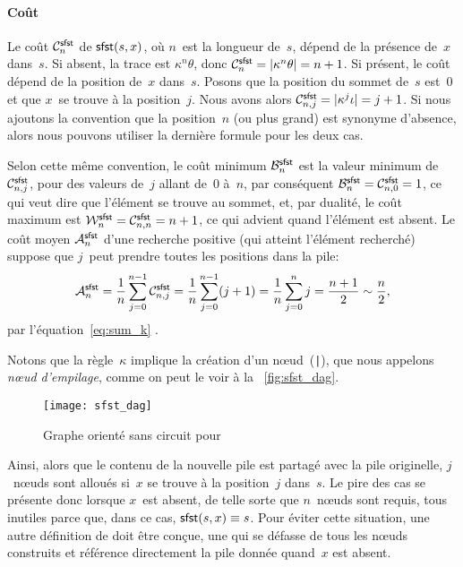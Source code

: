 \paragraph{Coût}

Le coût \(\C{\fun{sfst}}{n}\) de
\(\fun{sfst}(s,x)\), où \(n\)~est la longueur de~\(s\), dépend de la
présence de~\(x\) dans~\(s\). Si absent, la trace est
\(\kappa^n\theta\), donc \(\C{\fun{sfst}}{n} = \len{\kappa^n\theta} =
n + 1\). Si présent, le coût dépend de la position de~\(x\)
dans~\(s\). Posons que la position du sommet de~\(s\) est~\(0\) et que
\(x\)~se trouve à la position~\(j\). Nous avons alors
\(\C{\fun{sfst}}{n,j} = \len{\kappa^j\iota} = j +
1\). Si nous ajoutons la convention
que la position~\(n\) (ou plus grand) est synonyme d'absence, alors
nous pouvons utiliser la dernière formule pour les deux cas.

Selon cette même convention, le coût minimum
\(\B{\fun{sfst}}{n}\) est la valeur
minimum de \(\C{\fun{sfst}}{n,j}\),
pour des valeurs de~\(j\) allant de~\(0\) à~\(n\), par conséquent
\(\B{\fun{sfst}}{n} = \C{\fun{sfst}}{n,0} = 1\), ce qui veut dire que
l'élément se trouve au sommet, et, par dualité, le coût
maximum
est \(\W{\fun{sfst}}{n} =
\C{\fun{sfst}}{n,n} = n + 1\), ce qui advient quand l'élément est
absent. Le coût moyen
\(\M{\fun{sfst}}{n}\) d'une recherche positive (qui atteint l'élément recherché)
suppose que \(j\)~peut prendre toutes les positions dans la pile:
\begin{equation*}
  \M{\fun{sfst}}{n} = \frac{1}{n}\sum_{j=0}^{n-1}\C{\fun{sfst}}{n,j} =
  \frac{1}{n}\sum_{j=0}^{n-1}(j+1) = \frac{1}{n}\sum_{j=0}^{n}j
  = \frac{n+1}{2} \sim \frac{n}{2},
\end{equation*}
par l'équation~\eqref{eq:sum_k} .

Notons que la règle~\(\kappa\) implique la création d'un
n{\oe}ud~(\texttt{|}), que nous appelons \emph{n{\oe}ud
  d'empilage}, comme on peut le voir à la
\fig~\vref{fig:sfst_dag}.
\begin{figure}[b]
\centering
\texttt{[image: sfst\_dag]}
\caption{Graphe orienté sans circuit pour }
\label{fig:sfst_dag}
\end{figure}
Ainsi, alors que le contenu de la nouvelle pile est partagé avec la
pile originelle, \(j\)~n{\oe}uds sont alloués si~\(x\) se trouve à la
position~\(j\) dans~\(s\). Le pire des cas se présente donc lorsque
\(x\)~est absent, de telle sorte que \(n\)~n{\oe}uds sont requis, tous
inutiles parce que, dans ce cas, \(\fun{sfst}(s,x) \equiv s\). Pour
éviter cette situation, une autre définition de  doit être
conçue, une qui se défasse de tous les n{\oe}uds construits et
référence directement la pile donnée quand~\(x\) est absent.

